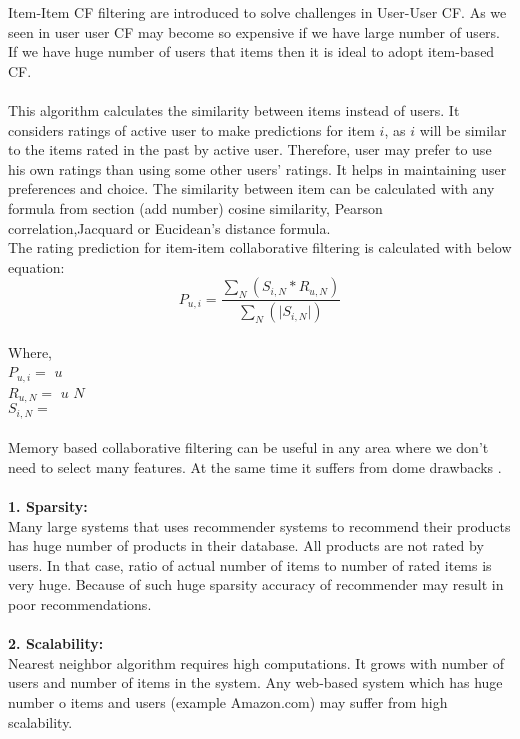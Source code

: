 Item-Item CF filtering are introduced to solve challenges in User-User CF. As we seen in user user CF may become so expensive if we have large number of users. If we have huge number of users that items then it is ideal to adopt item-based CF.
\\
\\
This algorithm calculates the similarity between items instead of users. It considers ratings of active user to make predictions for item $i$, as $i$ will be similar to the items rated in the past by active user. Therefore, user may prefer to use his own ratings than using some other users' ratings. It helps in maintaining user preferences and choice. The similarity between item can be calculated with any formula from section (add number) cosine similarity, Pearson
correlation,Jacquard or Eucidean's distance formula.
\\
The rating prediction for item-item collaborative filtering is calculated with below equation:
\begin{equation}
P_{u,i} = \frac { \sum_N(S_{i,N} * R_{u,N})}{\sum_N (\vert S_{i,N} \vert)}
\end{equation}
\\
Where, 
\\
\noindent
$P_{u,i} = $  $u$ 
\\
$R_{u,N} = $  $u$  $N$ 
\\
$S_{i,N} = $ 
\\
\\
Memory based collaborative filtering can be useful in any area where we don't need to select many features. At the same time it suffers from dome drawbacks \cite{10}.
\\
\\
\textbf{1. Sparsity:}
\\
Many large systems that uses recommender systems to recommend their products has huge number of products in their database. All products are not rated by users. In that case, ratio of actual number of items to number of rated items is very huge. Because of such huge sparsity accuracy of recommender may result in poor recommendations.
\\
\\
\textbf{2. Scalability:}
\\
Nearest neighbor algorithm requires high computations. It grows with number of users and number of items in the system. Any web-based system which has huge number o items and users (example Amazon.com) may suffer from high scalability.

